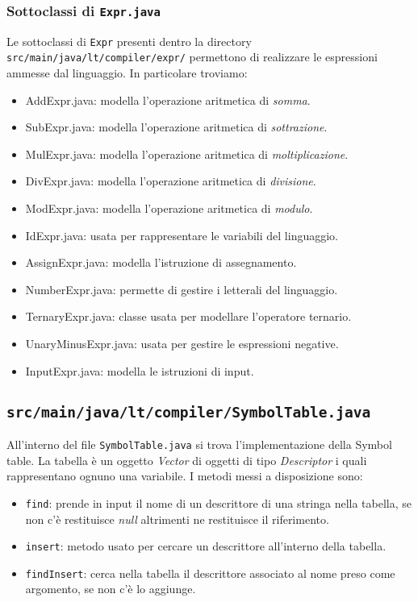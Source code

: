 \documentclass[10pt,a4paper]{article}
\begin{document}
\subsubsection{Sottoclassi di \texttt{Expr.java}}
Le sottoclassi di \texttt{Expr} presenti dentro la directory \texttt{src/main/java/lt/compiler/expr/} permettono di realizzare le espressioni ammesse dal linguaggio. In particolare troviamo:
\begin{itemize}
    \item AddExpr.java: modella l'operazione aritmetica di \textit{somma}.
    \item SubExpr.java: modella l'operazione aritmetica di \textit{sottrazione}.
    \item MulExpr.java: modella l'operazione aritmetica di \textit{moltiplicazione}.
    \item DivExpr.java: modella l'operazione aritmetica di \textit{divisione}.
    \item ModExpr.java: modella l'operazione aritmetica di \textit{modulo}.
    \item IdExpr.java: usata per rappresentare le variabili del linguaggio.
    \item AssignExpr.java: modella l'istruzione di assegnamento. 
    \item NumberExpr.java: permette di gestire i letterali del linguaggio.
    \item TernaryExpr.java: classe usata per modellare l'operatore ternario.
    \item UnaryMinusExpr.java: usata per gestire le espressioni negative. 
    \item InputExpr.java: modella le istruzioni di input.
\end{itemize}

\subsection{\texttt{src/main/java/lt/compiler/SymbolTable.java}}
All'interno del file \texttt{SymbolTable.java} si trova l'implementazione della Symbol table. La tabella è un oggetto \textit{Vector} di oggetti di tipo \textit{Descriptor} i quali rappresentano ognuno una variabile. I metodi messi a disposizione sono:
\begin{itemize}
\item \texttt{find}: prende in input il nome di un descrittore di una stringa nella tabella, se non c'è restituisce \textit{null} altrimenti ne restituisce il riferimento.
\item \texttt{insert}: metodo usato per cercare un descrittore all'interno della tabella.
\item \texttt{findInsert}: cerca nella tabella il descrittore associato al nome preso come argomento, se non c'è lo aggiunge.
\end{itemize}
\pagebreak
\end{document}

